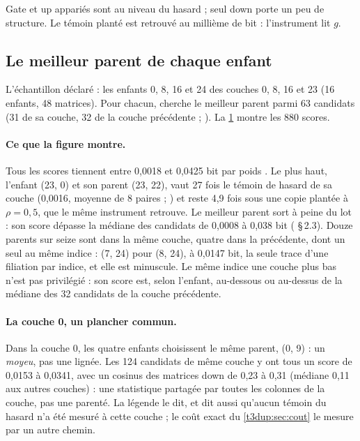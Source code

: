 Gate et up appariés sont au niveau du hasard ; seul down porte un peu de structure. Le témoin planté est retrouvé au millième de bit : l'instrument lit $g$.

\subsection{Le meilleur parent de chaque enfant}

L'échantillon déclaré : les enfants 0, 8, 16 et 24 des couches 0, 8, 16 et 23 (16 enfants, 48 matrices). Pour chacun,  cherche le meilleur parent parmi 63 candidats (31 de sa couche, 32 de la couche précédente ; ). La \cref{fig:t3-dup-parente} montre les 880 scores.

\begin{figure}[tbp]
\centering
\GrapheDupParente
{}
\label{fig:t3-dup-parente}
\end{figure}

\paragraph{Ce que la figure montre.} Tous les scores tiennent entre 0,0018 et 0,0425 bit par poids \mes. Le plus haut, l'enfant (23, 0) et son parent (23, 22), vaut 27 fois le témoin de hasard de sa couche (0,0016, moyenne de 8 paires ; ) et reste 4,9 fois sous une copie plantée à $\rho = 0{,}5$, que le même instrument retrouve. Le meilleur parent sort à peine du lot : son score dépasse la médiane des candidats de 0,0008 à 0,038 bit ( §\,2.3). Douze parents sur seize sont dans la même couche, quatre dans la précédente, dont un seul au même indice : (7, 24) pour (8, 24), à 0,0147 bit, la seule trace d'une filiation par indice, et elle est minuscule. Le même indice une couche plus bas n'est pas privilégié : son score est, selon l'enfant, au-dessous ou au-dessus de la médiane des 32 candidats de la couche précédente.

\paragraph{La couche 0, un plancher commun.} Dans la couche 0, les quatre enfants choisissent le même parent, (0, 9) : un \emph{moyeu}, pas une lignée. Les 124 candidats de même couche y ont tous un score de 0,0153 à 0,0341, avec un cosinus des matrices down de 0,23 à 0,31 (médiane 0,11 aux autres couches) \mes : une statistique partagée par toutes les colonnes de la couche, pas une parenté. La légende le dit, et dit aussi qu'aucun témoin du hasard n'a été mesuré à cette couche ; le coût exact du \cref{t3dup:sec:cout} le mesure par un autre chemin.

